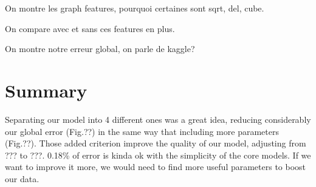 \documentclass[10pt,conference,compsocconf]{IEEEtran}
\begin{document}
On montre les graph features, pourquoi certaines sont sqrt, del, cube.

On compare avec et sans ces features en plus.

On montre notre erreur global, on parle de kaggle?



\section{Summary}

Separating our model into 4 different ones was a great idea, reducing considerably our global error (Fig.??) in the same way that including more parameters (Fig.??). Those added criterion improve the quality of our model, adjusting from ??? to ???.    
	0.18\% of error is kinda ok with the simplicity of the core models. If we want to improve it more, we would need to find more useful parameters to boost our data.
    


\end{document}
